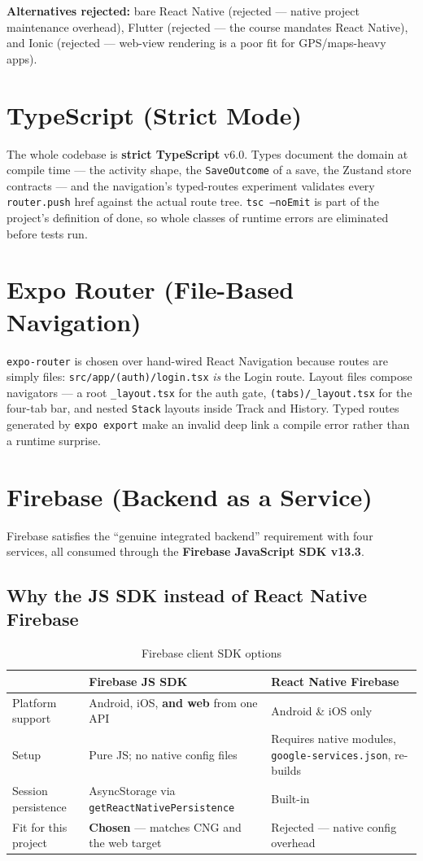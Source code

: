 \documentclass[12pt, a4paper]{report}
\newcommand{\pkg}[1]{\texttt{#1}}
\newcommand{\code}[1]{\texttt{#1}}
\begin{document}
\noindent \textbf{Alternatives rejected:} bare React Native (rejected ---
native project maintenance overhead), Flutter (rejected --- the course
mandates React Native), and Ionic (rejected --- web-view rendering is a poor
fit for GPS/maps-heavy apps).

\section{TypeScript (Strict Mode)}
The whole codebase is \textbf{strict TypeScript} v6.0. Types document the
domain at compile time --- the activity shape, the \code{SaveOutcome} of a
save, the Zustand store contracts --- and the navigation's typed-routes
experiment validates every \code{router.push} href against the actual route
tree. \code{tsc --noEmit} is part of the project's definition of done, so
whole classes of runtime errors are eliminated before tests run.

\section{Expo Router (File-Based Navigation)}
\pkg{expo-router} is chosen over hand-wired React Navigation because routes
are simply files: \code{src/app/(auth)/login.tsx} \emph{is} the Login route.
Layout files compose navigators --- a root \code{\_layout.tsx} for the auth
gate, \code{(tabs)/\_layout.tsx} for the four-tab bar, and nested
\code{Stack} layouts inside Track and History. Typed routes generated by
\code{expo export} make an invalid deep link a compile error rather than a
runtime surprise.

\section{Firebase (Backend as a Service)}
Firebase satisfies the ``genuine integrated backend'' requirement with four
services, all consumed through the \textbf{Firebase JavaScript SDK v13.3}.

\subsection{Why the JS SDK instead of React Native Firebase}
\begin{table}[H]
\centering
\caption{Firebase client SDK options}
\label{tab:sdk}
\small
\begin{tabularx}{\textwidth}{@{}l L L@{}}
\toprule
 & \textbf{Firebase JS SDK} & \textbf{React Native Firebase} \\
\midrule
Platform support & Android, iOS, \textbf{and web} from one API & Android \&
  iOS only \\
Setup & Pure JS; no native config files & Requires native modules,
  \code{google-services.json}, re-builds \\
Session persistence & AsyncStorage via
  \code{getReactNativePersistence} & Built-in \\
Fit for this project & \textbf{Chosen} --- matches CNG and the web target &
  Rejected --- native config overhead \\
\bottomrule
\end{tabularx}
\end{table}
\end{document}
